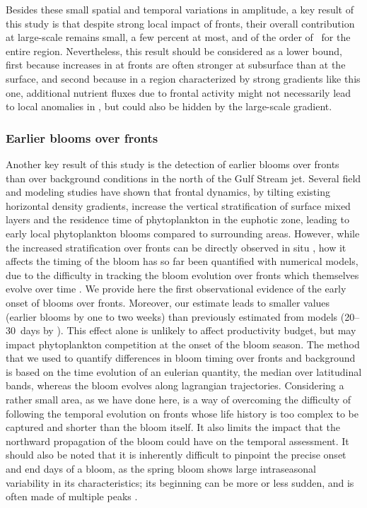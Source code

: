 Besides these small spatial and temporal variations in amplitude, a key result of this study is that despite strong local impact of fronts, their overall contribution at large-scale remains small, a few percent at most, and of the order of~ for the entire region.
Nevertheless, this result should be considered as a lower bound, first because increases in  at fronts are often stronger at subsurface than at the surface, and second because in a region characterized by strong gradients like this one, additional nutrient fluxes due to frontal activity might not necessarily lead to local anomalies in , but could also be hidden by the large-scale gradient.


\subsubsection{Earlier blooms over fronts}

Another key result of this study is the detection of earlier blooms over fronts than over background conditions in the north of the Gulf Stream jet.
Several field and modeling studies have shown that frontal dynamics, by tilting existing horizontal density gradients, increase the vertical stratification of surface mixed layers \parencite{taylor_2011} and the residence time of phytoplankton in the euphotic zone, leading to early local phytoplankton blooms compared to surrounding areas.
However, while the increased stratification over fronts can be directly observed in situ \parencite{karleskind_2011, mahadevan_2012}, how it affects the timing of the bloom has so far been quantified with numerical models, due to the difficulty in tracking the bloom evolution over fronts which themselves evolve over time \parencite{levy_2000, karleskind_2011, mahadevan_2012}.
We provide here the first observational evidence of the early onset of blooms over fronts.
Moreover, our estimate leads to smaller values (earlier blooms by one to two weeks) than previously estimated from models (20--30~days by \textcite{mahadevan_2012}).
This effect alone is unlikely to affect productivity budget, but may impact phytoplankton competition at the onset of the bloom season.
The method that we used to quantify differences in bloom timing over fronts and background is based on the time evolution of an eulerian quantity, the  median over latitudinal bands, whereas the bloom evolves along lagrangian trajectories.
Considering a rather small area, as we have done here, is a way of overcoming the difficulty of following the temporal evolution on fronts whose life history is too complex to be captured and shorter than the bloom itself.
It also limits the impact that the northward propagation of the bloom could have on the temporal assessment.
It should also be noted that it is inherently difficult to pinpoint the precise onset and end days of a bloom, as the spring bloom shows large intraseasonal variability in its characteristics; its beginning can be more or less sudden, and is often made of multiple peaks \parencite{keerthi_2020}.


